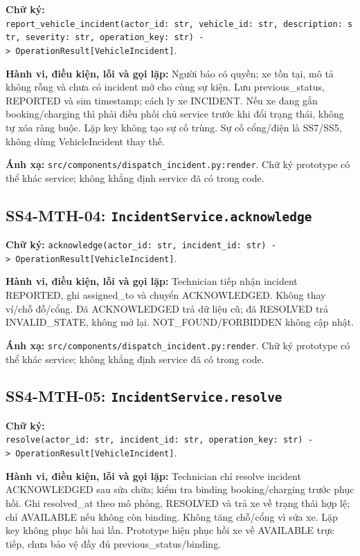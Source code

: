 \documentclass[11pt,a4paper]{article}
\begin{document}
\textbf{Chữ ký:}
\texttt{report\_vehicle\_incident(actor\_id:\ str,\ vehicle\_id:\ str,\ description:\ str,\ severity:\ str,\ operation\_key:\ str)\ -\textgreater{}\ OperationResult{[}VehicleIncident{]}}.

\textbf{Hành vi, điều kiện, lỗi và gọi lặp:} Người báo có quyền; xe tồn
tại, mô tả không rỗng và chưa có incident mở cho cùng sự kiện. Lưu
previous\_status, REPORTED và sim timestamp; cách ly xe INCIDENT. Nếu xe
đang gắn booking/charging thì phải điều phối chủ service trước khi đổi
trạng thái, không tự xóa ràng buộc. Lặp key không tạo sự cố trùng. Sự cố
cổng/điện là SS7/SS5, không dùng VehicleIncident thay thế.

\textbf{Ánh xạ:} \texttt{src/components/dispatch\_incident.py:render}.
Chữ ký prototype có thể khác service; không khẳng định service đã có
trong code.

\hypertarget{ss4-mth-04-incidentservice.acknowledge}{%
\subsection{\texorpdfstring{SS4-MTH-04:
\texttt{IncidentService.acknowledge}}{SS4-MTH-04: IncidentService.acknowledge}}\label{ss4-mth-04-incidentservice.acknowledge}}

\textbf{Chữ ký:}
\texttt{acknowledge(actor\_id:\ str,\ incident\_id:\ str)\ -\textgreater{}\ OperationResult{[}VehicleIncident{]}}.

\textbf{Hành vi, điều kiện, lỗi và gọi lặp:} Technician tiếp nhận
incident REPORTED, ghi assigned\_to và chuyển ACKNOWLEDGED. Không thay
ví/chỗ đỗ/cổng. Đã ACKNOWLEDGED trả dữ liệu cũ; đã RESOLVED trả
INVALID\_STATE, không mở lại. NOT\_FOUND/FORBIDDEN không cập nhật.

\textbf{Ánh xạ:} \texttt{src/components/dispatch\_incident.py:render}.
Chữ ký prototype có thể khác service; không khẳng định service đã có
trong code.

\hypertarget{ss4-mth-05-incidentservice.resolve}{%
\subsection{\texorpdfstring{SS4-MTH-05:
\texttt{IncidentService.resolve}}{SS4-MTH-05: IncidentService.resolve}}\label{ss4-mth-05-incidentservice.resolve}}

\textbf{Chữ ký:}
\texttt{resolve(actor\_id:\ str,\ incident\_id:\ str,\ operation\_key:\ str)\ -\textgreater{}\ OperationResult{[}VehicleIncident{]}}.

\textbf{Hành vi, điều kiện, lỗi và gọi lặp:} Technician chỉ resolve
incident ACKNOWLEDGED sau sửa chữa; kiểm tra binding booking/charging
trước phục hồi. Ghi resolved\_at theo mô phỏng, RESOLVED và trả xe về
trạng thái hợp lệ; chỉ AVAILABLE nếu không còn binding. Không tăng
chỗ/cổng vì sửa xe. Lặp key không phục hồi hai lần. Prototype hiện phục
hồi xe về AVAILABLE trực tiếp, chưa bảo vệ đầy đủ
previous\_status/binding.
\end{document}
